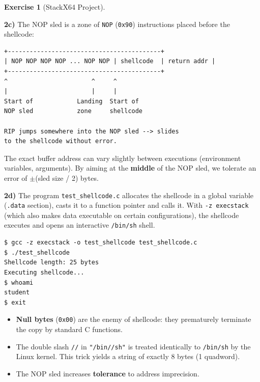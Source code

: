 \documentclass[a4paper,11pt]{article}
\theoremstyle{plain}
\theoremstyle{definition}
\newtheorem{exercice}{Exercise}
\begin{document}
\begin{exercice}[StackX64 Project]
\begin{correction}
\textbf{2c)} The NOP sled is a zone of \texttt{NOP} (\texttt{0x90}) instructions placed before the shellcode:
\begin{lstlisting}[style=GDBStyle]
+------------------------------------------+
| NOP NOP NOP NOP ... NOP NOP | shellcode  | return addr |
+------------------------------------------+
^                       ^     ^
|                       |     |
Start of            Landing  Start of
NOP sled            zone     shellcode

RIP jumps somewhere into the NOP sled --> slides
to the shellcode without error.
\end{lstlisting}

The exact buffer address can vary slightly between executions (environment variables, arguments). By aiming at the \textbf{middle} of the NOP sled, we tolerate an error of $\pm$(sled size / 2) bytes.

\textbf{2d)} The program \texttt{test\_shellcode.c} allocates the shellcode in a global variable (\texttt{.data} section), casts it to a function pointer and calls it. With \texttt{-z execstack} (which also makes data executable on certain configurations), the shellcode executes and opens an interactive \texttt{/bin/sh} shell.

\begin{lstlisting}[style=GDBStyle]
$ gcc -z execstack -o test_shellcode test_shellcode.c
$ ./test_shellcode
Shellcode length: 25 bytes
Executing shellcode...
$ whoami
student
$ exit
\end{lstlisting}

\begin{pointcle}
\begin{itemize}
    \item \textbf{Null bytes} (\texttt{0x00}) are the enemy of shellcode: they prematurely terminate the copy by standard C functions.
    \item The double slash \texttt{//} in \texttt{"/bin//sh"} is treated identically to \texttt{/bin/sh} by the Linux kernel. This trick yields a string of exactly 8 bytes (1 quadword).
    \item The NOP sled increases \textbf{tolerance} to address imprecision.
\end{itemize}
\end{pointcle}

\end{correction}




\end{exercice}
\end{document}
